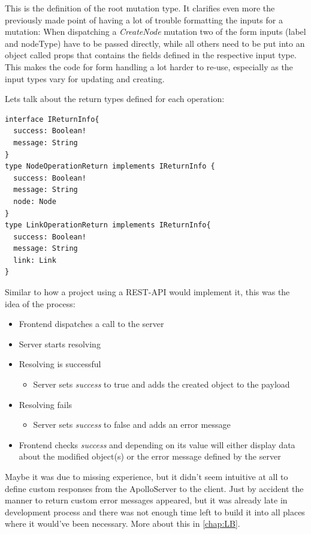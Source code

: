This is the definition of the root mutation type. It clarifies even more the previously made point of having a lot of trouble formatting the inputs for a mutation: When dispatching a \emph{CreateNode} mutation two of the form inputs (label and nodeType) have to be passed directly, while all others need to be put into an object called props that contains the fields defined in the respective input type. This makes the code for form handling a lot harder to re-use, especially as the input types vary for updating and creating.

Lets talk about the return types defined for each operation:
\begin{lstlisting}[caption={Return Types}]
interface IReturnInfo{
  success: Boolean!
  message: String
}
type NodeOperationReturn implements IReturnInfo {
  success: Boolean!
  message: String
  node: Node
}
type LinkOperationReturn implements IReturnInfo{
  success: Boolean!
  message: String
  link: Link
}
\end{lstlisting}
Similar to how a project using a REST-API would implement it, this was the idea of the process:
\begin{itemize}
\item Frontend dispatches a call to the server
\item Server starts resolving
\item Resolving is successful
	\begin{itemize}
		\item Server sets \emph{success} to true and adds the created object to the payload
	\end{itemize}
\item Resolving fails
	\begin{itemize}
		\item Server sets \emph{success} to false and adds an error message
	\end{itemize}

\item Frontend checks \emph{success} and depending on its value will either display data about the modified object(s) or the error message defined by the server
\end{itemize}

Maybe it was due to missing experience, but it didn't seem intuitive at all to define custom responses from the ApolloServer to the client. Just by accident the manner to return custom error messages appeared, but it was already late in development process and there was not enough time left to build it into all places where it would've been necessary. More about this in \autoref{chap:LB}.

